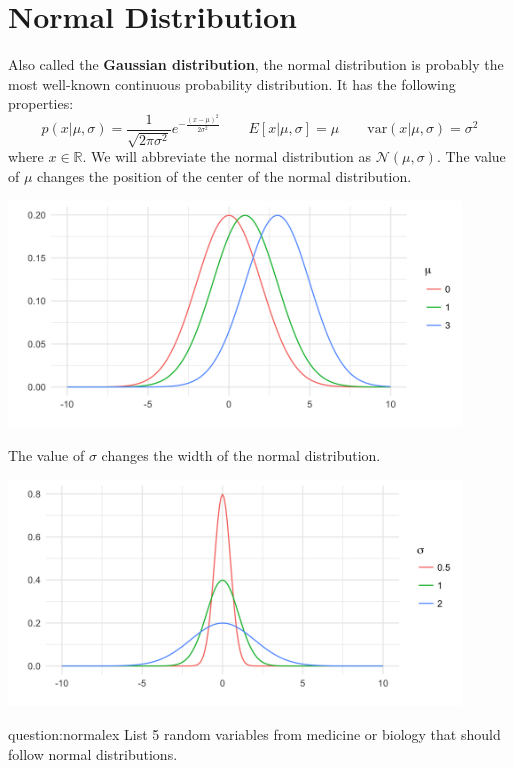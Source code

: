 \section{Normal Distribution \label{sect:normal}} 

Also called the \textbf{Gaussian distribution}, the normal distribution is probably the most well-known continuous probability distribution. It has the following properties:
\begin{equation*} p(x | \mu, \sigma) = \frac{1}{\sqrt{2 \pi \sigma^2}} e^{-\frac{(x-\mu)^2}{2 \sigma^2}} \qquad  E[x| \mu, \sigma] = \mu \qquad \text{var}(x | \mu, \sigma) = \sigma^2 \end{equation*}
where $x \in \mathbb{R}$. We will abbreviate the normal distribution as $\mathcal{N}(\mu, \sigma)$.  The value of $\mu$ changes the position of the center of the normal distribution.
\begin{center}
\includegraphics[width=0.9\textwidth]{img/l01-figure1a-normal-mean-change.png}
\end{center}
The value of $\sigma$ changes the width of the normal distribution.
\begin{center}
\includegraphics[width=0.9\textwidth]{img/l01-figure1b-normal-sd-change.png}
\end{center}

\begin{question}{question:normalex}
List 5 random variables from medicine or biology that should follow normal distributions.
\end{question}
 

